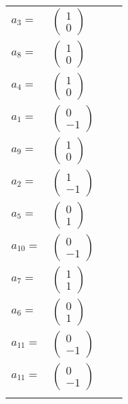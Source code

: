 \documentclass[1p]{elsarticle_modified}
\theoremstyle{definition}
\begin{document}
\begin{tabular}{m{7pt} m{180pt} m{7pt} m{180pt} }
\flushright $a_{3}=$&$\begin{pmatrix}1\\0\end{pmatrix}$ \\
\flushright $a_{8}=$&$\begin{pmatrix}1\\0\end{pmatrix}$ \\
\flushright $a_{4}=$&$\begin{pmatrix}1\\0\end{pmatrix}$ \\
\flushright $a_{1}=$&$\begin{pmatrix}0\\-1\end{pmatrix}$ \\
\flushright $a_{9}=$&$\begin{pmatrix}1\\0\end{pmatrix}$ \\
\flushright $a_{2}=$&$\begin{pmatrix}1\\-1\end{pmatrix}$ \\
\flushright $a_{5}=$&$\begin{pmatrix}0\\1\end{pmatrix}$ \\
\flushright $a_{10}=$&$\begin{pmatrix}0\\-1\end{pmatrix}$ \\
\flushright $a_{7}=$&$\begin{pmatrix}1\\1\end{pmatrix}$ \\
\flushright $a_{6}=$&$\begin{pmatrix}0\\1\end{pmatrix}$ \\
\flushright $a_{11}=$&$\begin{pmatrix}0\\-1\end{pmatrix}$\\ \flushright $a_{11}=$&$\begin{pmatrix}0\\-1\end{pmatrix}$\\&\end{tabular}
\end{document}
